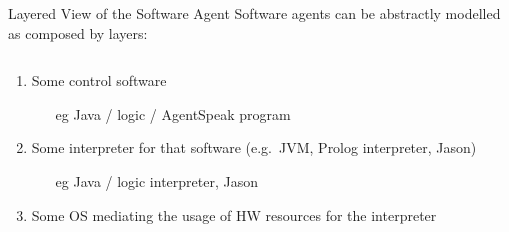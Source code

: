 \documentclass[presentation]{beamer}\mode<presentation>{\usetheme{AMSBolognaFC}}
\begin{document}
\begin{frame}{Layered View of the Software Agent}
    Software agents can be abstractly modelled as composed by \alert{layers}:
    \begin{columns}
        \begin{column}{.5\linewidth}
            \begin{enumerate}
                \item Some control software
                \begin{itemize}
                    \item[eg] Java / logic / AgentSpeak program
                \end{itemize}
                
                \item Some interpreter for that software (e.g.~JVM, Prolog interpreter, Jason)
                \begin{itemize}
                    \item[eg] Java / logic interpreter, Jason
                \end{itemize}

                \item Some OS mediating the usage of HW resources for the interpreter
                

\end{enumerate}
\end{column}
\end{columns}
\end{frame}
\end{document}
